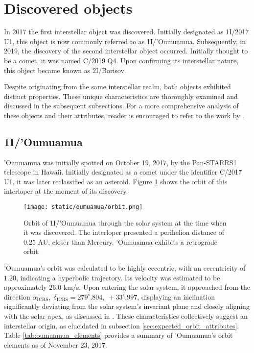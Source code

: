 \section{Discovered objects}

In 2017 the first interstellar object was discovered. Initially designated as
1I/2017 U1, this object is now commonly referred to as 1I/'Oumuamua.
Subsequently, in 2019, the discovery of the second interstellar object occurred.
Initially thought to be a comet, it was named C/2019 Q4. Upon confirming its
interstellar nature, this object became known as 2I/Borisov.

Despite originating from the same interstellar realm, both objects exhibited
distinct properties. These unique characteristics are thoroughly examined and
discussed in the subsequent subsections. For a more comprehensive analysis of
these objects and their attributes, reader is encouraged to refer to the work
by \cite{jewitt2022}.

\subsection{1I/'Oumuamua}

'Oumuamua was initially spotted on October 19, 2017, by the Pan-STARRS1
telescope in Hawaii. Initially designated as a comet under the identifier C/2017
U1, it was later reclassified as an asteroid. Figure \ref{fig:oumuamua_orbit}
shows the orbit of this interloper at the moment of its discovery.

\begin{figure}[H]
  \centering
  \texttt{[image: static/oumuamua/orbit.png]}
  \caption[Orbit of 1I/'Oumuamua through the solar system]{
    Orbit of 1I/'Oumuamua through the solar system at the time when it was
    discovered. The interloper presented a perihelion distance of 0.25 AU,
    closer than Mercury. 'Oumuamua exhibits a retrograde orbit.
  }
  \label{fig:oumuamua_orbit}
\end{figure}

'Oumuamua's orbit was calculated to be highly eccentric, with an eccentricity of
$1.20$, indicating a hyperbolic trajectory. Its velocity was estimated to be
approximately $26.0$ km/s. Upon entering the solar system, it approached from
the direction $\alpha_{\text{ICRS}},\; \delta_{\text{ICRS}} = 279^\circ.804,\;
+33^\circ.997$, displaying an inclination significantly deviating from the solar
system's invariant plane and closely aligning with the solar apex, as discussed
in \cite{mamajek2017}. These characteristics collectively suggest an
interstellar origin, as elucidated in subsection
\ref{sec:expected_orbit_attributes}. Table \ref{tab:oumuamua_elements} provides
a summary of 'Oumuamua's orbit elements as of November 23, 2017.

